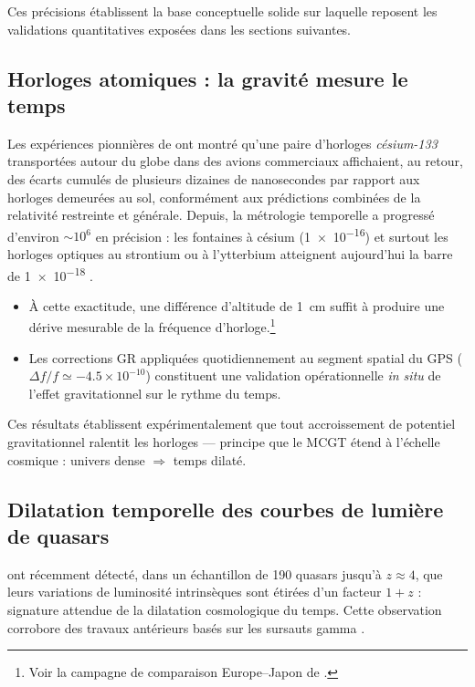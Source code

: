 \documentclass[11pt]{article}
\begin{document}
Ces précisions établissent la base conceptuelle solide sur laquelle reposent les validations quantitatives exposées dans les sections suivantes.

\subsection{Horloges atomiques : la gravité mesure le temps}
\label{sec:horloges}

Les expériences pionnières de \textcite{Hafele1972a,Hafele1972b} ont montré
qu’une paire d’horloges \emph{césium-133} transportées autour du globe dans
des avions commerciaux affichaient, au retour, des écarts cumulés de plusieurs
dizaines de nanosecondes par rapport aux horloges demeurées au sol, conformément
aux prédictions combinées de la relativité restreinte et générale.  
Depuis, la métrologie temporelle a progressé d’environ
\(\sim10^{6}\) en précision : les fontaines à césium
(\num{1e-16}) et surtout les horloges optiques au strontium ou à l’ytterbium
atteignent aujourd’hui la barre de \num{1e-18} \parencite{Ludlow2015,Delva2019}.

\begin{itemize}
  \item À cette exactitude, une différence d’altitude de \SI{1}{\centi\metre}
        suffit à produire une dérive mesurable de la fréquence d’horloge.\footnote{Voir la
        campagne de comparaison Europe–Japon de \textcite{Grotti2018}.}
  \item Les corrections GR appliquées quotidiennement au segment spatial du GPS (\(\Delta f/f\simeq -4.5\times10^{-10}\)) \parencite{Ashby2003} constituent une validation opérationnelle
        \emph{in situ} de l’effet gravitationnel sur le rythme du temps.
\end{itemize}

Ces résultats établissent expérimentalement que tout accroissement de
potentiel gravitationnel ralentit les horloges — principe que le MCGT étend à
l’échelle cosmique : univers dense \(\Rightarrow\) temps dilaté.

\subsection{Dilatation temporelle des courbes de lumière de quasars}

\textcite{Cao2023} ont récemment détecté, dans un échantillon de \num{190}
quasars jusqu’à \(z\approx4\), que leurs variations de luminosité intrinsèques
sont étirées d’un facteur \(1+z\) : signature attendue de la dilatation
cosmologique du temps.  
Cette observation corrobore des travaux antérieurs basés sur les sursauts
gamma \parencite{Kocevski2013}.
\end{document}
